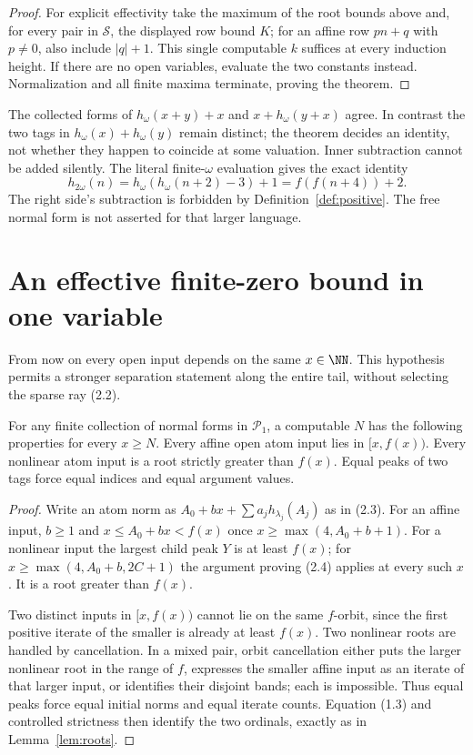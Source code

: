 \documentclass[11pt,a4paper]{article}
\begin{document}
\begin{proof}
For explicit effectivity take the maximum of the root bounds above and,
for every pair in $\mathcal S$, the displayed row bound $K$; for an affine
row $pn+q$ with $p\ne0$, also include $|q|+1$. This single computable
$k$ suffices at every induction height. If there are no open variables,
evaluate the two constants instead. Normalization and all finite maxima
terminate, proving the theorem.
\end{proof}

\begin{example}
The collected forms of $h_\omega(x+y)+x$ and $x+h_\omega(y+x)$ agree.
In contrast the two tags in $h_\omega(x)+h_\omega(y)$ remain distinct;
the theorem decides an identity, not whether they happen to coincide at
some valuation. Inner subtraction cannot be added silently. The literal
finite-$\omega$ evaluation gives the exact identity
\[
 h_{2\omega}(n)=h_\omega(h_\omega(n+2)-3)+1
              =f(f(n+4))+2.
\]
The right side's subtraction is forbidden by Definition~\ref{def:positive}.
The free normal form is not asserted for that larger language.
\end{example}

\section{An effective finite-zero bound in one variable}
From now on every open input depends on the same $x\in\NN$.
This hypothesis permits a stronger separation statement along the entire
tail, without selecting the sparse ray (2.2).

\begin{lemma}\label{lem:oneinput}
For any finite collection of normal forms in $\mathcal P_1$, a computable
$N$ has the following properties for every $x\ge N$.
Every affine open atom input lies in $[x,f(x))$. Every nonlinear atom input
is a root strictly greater than $f(x)$. Equal peaks of two tags force equal
indices and equal argument values.
\end{lemma}
\begin{proof}
Write an atom norm as $A_0+bx+\sum a_jh_{\lambda_j}(A_j)$ as in (2.3).
For an affine input, $b\ge1$ and
$x\le A_0+bx<f(x)$ once $x\ge\max(4,A_0+b+1)$.
For a nonlinear input the largest child peak $Y$ is at least $f(x)$;
for $x\ge\max(4,A_0+b,2C+1)$ the argument proving (2.4) applies
at every such $x$. It is a root greater than $f(x)$.

Two distinct inputs in $[x,f(x))$ cannot lie on the same $f$-orbit,
since the first positive iterate of the smaller is already at least
$f(x)$. Two nonlinear roots are handled by cancellation. In a mixed pair,
orbit cancellation either puts the larger nonlinear root in the range of
$f$, expresses the smaller affine input as an iterate of that larger
input, or identifies their disjoint bands; each is impossible. Thus equal
peaks force equal initial norms and equal iterate counts. Equation (1.3)
and controlled strictness then identify the two ordinals, exactly as in
Lemma~\ref{lem:roots}.
\end{proof}
\end{document}
